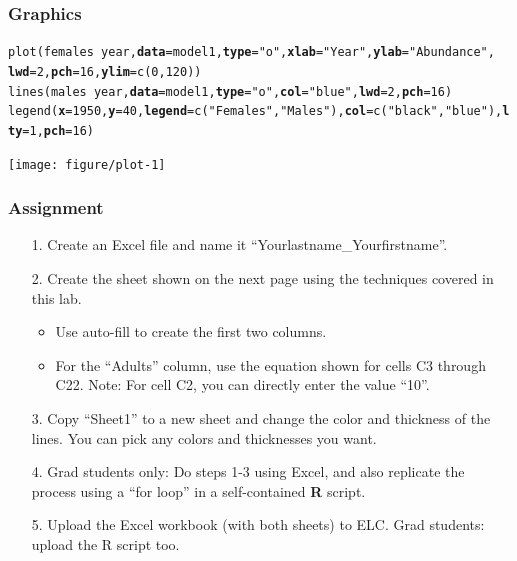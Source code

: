 \documentclass[color=usenames,dvipsnames]{beamer}\usepackage[]{graphicx}\usepackage[]{color}
\makeatletter
\newcommand{\hlnum}[1]{\textcolor[rgb]{0.69,0.494,0}{#1}}%
\newcommand{\hlstr}[1]{\textcolor[rgb]{0.749,0.012,0.012}{#1}}%
\newcommand{\hlopt}[1]{\textcolor[rgb]{0,0,0}{#1}}%
\newcommand{\hlstd}[1]{\textcolor[rgb]{0,0,0}{#1}}%
\newcommand{\hlkwc}[1]{\textcolor[rgb]{0,0,0}{\textbf{#1}}}%
\newcommand{\hlkwd}[1]{\textcolor[rgb]{0.004,0.004,0.506}{#1}}%
\newenvironment{kframe}{%
 \def\at@end@of@kframe{}%
 \ifinner\ifhmode%
  \def\at@end@of@kframe{\end{minipage}}%
  \begin{minipage}{\columnwidth}%
 \fi\fi%
 \def\FrameCommand##1{\hskip\@totalleftmargin \hskip-\fboxsep
 \colorbox{shadecolor}{##1}\hskip-\fboxsep
     \hskip-\linewidth \hskip-\@totalleftmargin \hskip\columnwidth}%
 \MakeFramed {\advance\hsize-\width
   \@totalleftmargin\z@ \linewidth\hsize
   \@setminipage}}%
 {\par\unskip\endMakeFramed%
 \at@end@of@kframe}
\newenvironment{knitrout}{}{} %
\makeatother
\begin{document}
\begin{frame}[fragile]
  \frametitle{Graphics}
\begin{knitrout}\tiny
{}\color{fgcolor}\begin{kframe}
\begin{alltt}
\hlkwd{plot}\hlstd{(females} \hlopt{~} \hlstd{year,} \hlkwc{data}\hlstd{=model1,} \hlkwc{type}\hlstd{=}\hlstr{"o"}\hlstd{,} \hlkwc{xlab}\hlstd{=}\hlstr{"Year"}\hlstd{,} \hlkwc{ylab}\hlstd{=}\hlstr{"Abundance"}\hlstd{,}
     \hlkwc{lwd}\hlstd{=}\hlnum{2}\hlstd{,} \hlkwc{pch}\hlstd{=}\hlnum{16}\hlstd{,} \hlkwc{ylim}\hlstd{=}\hlkwd{c}\hlstd{(}\hlnum{0}\hlstd{,} \hlnum{120}\hlstd{))}
\hlkwd{lines}\hlstd{(males} \hlopt{~} \hlstd{year,} \hlkwc{data}\hlstd{=model1,} \hlkwc{type}\hlstd{=}\hlstr{"o"}\hlstd{,} \hlkwc{col}\hlstd{=}\hlstr{"blue"}\hlstd{,} \hlkwc{lwd}\hlstd{=}\hlnum{2}\hlstd{,} \hlkwc{pch}\hlstd{=}\hlnum{16}\hlstd{)}
\hlkwd{legend}\hlstd{(}\hlkwc{x}\hlstd{=}\hlnum{1950}\hlstd{,} \hlkwc{y}\hlstd{=}\hlnum{40}\hlstd{,} \hlkwc{legend}\hlstd{=}\hlkwd{c}\hlstd{(}\hlstr{"Females"}\hlstd{,} \hlstr{"Males"}\hlstd{),} \hlkwc{col}\hlstd{=}\hlkwd{c}\hlstd{(}\hlstr{"black"}\hlstd{,} \hlstr{"blue"}\hlstd{),} \hlkwc{lty}\hlstd{=}\hlnum{1}\hlstd{,} \hlkwc{pch}\hlstd{=}\hlnum{16}\hlstd{)}
\end{alltt}
\end{kframe}
\texttt{[image: figure/plot-1]} 

\end{knitrout}
\end{frame}




\begin{frame}
  \frametitle{Assignment}
  \small %
  \begin{enumerate}
    \item[1.] Create an Excel file and name it ``Yourlastname\_Yourfirstname''.
    \item[2.] Create the sheet shown on the next page using the techniques covered in this lab.
      \begin{itemize}
        \footnotesize
        \item Use auto-fill to create the first two columns.
        \item For the ``Adults'' column, use the equation shown
          for cells C3 through C22. Note: For cell C2, you can directly
          enter the value ``10''.
      \end{itemize}
    \item[3.] Copy ``Sheet1'' to a new sheet and change the color and
      thickness of the lines. You can pick any colors and thicknesses you want.
    \item[4.] Grad students only: Do steps 1-3 using Excel, and also
      replicate the process using a ``for loop'' in a self-contained
      {\bf R} script.
    \item[5.] Upload the Excel workbook (with both sheets) to ELC. Grad students: upload the
      R script too.
  \end{enumerate}
\end{frame}
\end{document}
